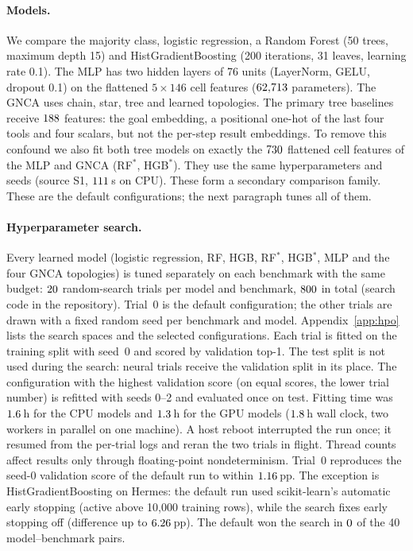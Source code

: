 \documentclass[10pt,twocolumn,letterpaper]{article}
\begin{document}
\paragraph{Models.} We compare the majority class, logistic regression, a Random Forest (50 trees, maximum depth 15) and HistGradientBoosting (200 iterations, 31 leaves, learning rate 0.1). The MLP has two hidden layers of 76 units (LayerNorm, GELU, dropout 0.1) on the flattened $5\times146$ cell features ($62{,}713$ parameters). The GNCA uses chain, star, tree and learned topologies. The primary tree baselines receive $188$ features: the goal embedding, a positional one-hot of the last four tools and four scalars, but not the per-step result embeddings. To remove this confound we also fit both tree models on exactly the $730$ flattened cell features of the MLP and GNCA (RF$^\ast$, HGB$^\ast$). They use the same hyperparameters and seeds (source S1, $111$\,s on CPU). These form a secondary comparison family. These are the default configurations; the next paragraph tunes all of them.
\paragraph{Hyperparameter search.} Every learned model (logistic regression, RF, HGB, RF$^\ast$, HGB$^\ast$, MLP and the four GNCA topologies) is tuned separately on each benchmark with the same budget: $20$ random-search trials per model and benchmark, $800$ in total (search code in the repository). Trial~0 is the default configuration; the other trials are drawn with a fixed random seed per benchmark and model. Appendix~\ref{app:hpo} lists the search spaces and the selected configurations. Each trial is fitted on the training split with seed~0 and scored by validation top-1. The test split is not used during the search: neural trials receive the validation split in its place. The configuration with the highest validation score (on equal scores, the lower trial number) is refitted with seeds 0--2 and evaluated once on test. Fitting time was $1.6$\,h for the CPU models and $1.3$\,h for the GPU models ($1.8$\,h wall clock, two workers in parallel on one machine). A host reboot interrupted the run once; it resumed from the per-trial logs and reran the two trials in flight. Thread counts affect results only through floating-point nondeterminism. Trial~0 reproduces the seed-0 validation score of the default run to within $1.16$\,pp. The exception is HistGradientBoosting on Hermes: the default run used scikit-learn's automatic early stopping (active above 10{,}000 training rows), while the search fixes early stopping off (difference up to $6.26$\,pp). The default won the search in $0$ of the 40 model--benchmark pairs.
\end{document}
